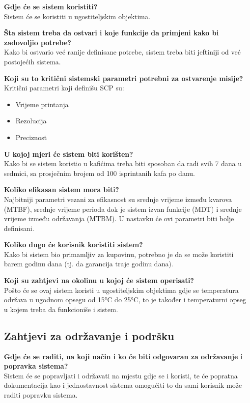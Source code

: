 \documentclass[12pt]{article}
\begin{document}
\textbf{Gdje će se sistem koristiti?}\\
Sistem će se koristiti u ugostiteljskim objektima. 

\textbf{Šta sistem treba da ostvari i koje funkcije da primjeni kako bi zadovoljio potrebe?}\\
Kako bi ostvario već ranije definisane potrebe, sistem treba biti jeftiniji od već postojećih sistema.

\textbf{Koji su to kritični sistemski parametri potrebni za ostvarenje misije?}\\
Kritični parametri koji definišu SCP su:
\begin{itemize}
\item Vrijeme printanja
\item Rezolucija
\item Preciznost
\end{itemize}

\textbf{U kojoj mjeri će sistem biti korišten?}\\
Kako bi se sistem koristio u kafićima treba biti sposoban da radi svih 7 dana u sedmici, sa prosječnim brojem od 100 isprintanih kafa po danu.

\textbf{Koliko efikasan sistem mora biti?}\\
Najbitniji parametri vezani za efikasnost su srednje vrijeme između kvarova (MTBF), srednje vrijeme perioda dok je sistem izvan funkcije (MDT) i srednje vrijeme između održavanja (MTBM). U nastavku će ovi parametri biti bolje definisani.

\textbf{Koliko dugo će korisnik koristiti sistem?}\\
Kako bi sistem bio primamljiv za kupovinu, potrebno je da se može koristiti barem godinu dana (tj. da garancija traje godinu dana).

\textbf{Koji su zahtjevi na okolinu u kojoj će sistem operisati?}\\
Pošto će se ovaj sistem koristi u ugostiteljskim objektima gdje se temperatura održava u ugodnom opsegu od 15°C do 25°C, to je također i temperaturni opseg u kojem treba da funkcioniše i sistem.

\newpage

\subsection{Zahtjevi za održavanje i podršku}
\textbf{Gdje će se raditi, na koji način i ko će biti odgovaran za održavanje i popravka sistema?}\\
Sistem će se popravljati i održavati na mjestu gdje se i koristi, te će popratna dokumentacija kao i jednostavnost sistema omogućiti to da sami korisnik može raditi popravku sistema.
\end{document}
